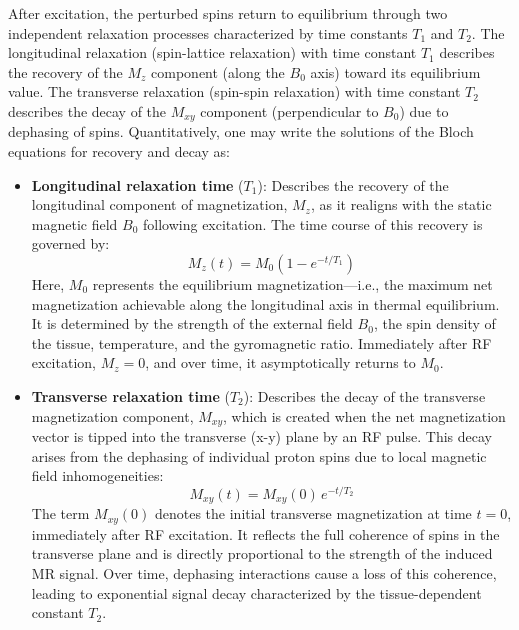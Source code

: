 After excitation, the perturbed spins return to equilibrium through two independent relaxation processes characterized by time constants $T_1$ and $T_2$. The longitudinal relaxation (spin-lattice relaxation) with time constant $T_1$ describes the recovery of the $M_z$ component (along the $B_0$ axis) toward its equilibrium value. The transverse relaxation (spin-spin relaxation) with time constant $T_2$ describes the decay of the $M_{xy}$ component (perpendicular to $B_0$) due to dephasing of spins. Quantitatively, one may write the solutions of the Bloch equations for recovery and decay as:
\begin{itemize}
    \item \textbf{Longitudinal relaxation time} (\(T_1\)): Describes the recovery of the longitudinal component of magnetization, \(M_z\), as it realigns with the static magnetic field \(B_0\) following excitation. The time course of this recovery is governed by:
    \begin{equation}
    M_z(t) = M_0 \left(1 - e^{-t/T_1}\right)
    \end{equation}
    Here, \( M_0 \) represents the equilibrium magnetization—i.e., the maximum net magnetization achievable along the longitudinal axis in thermal equilibrium. It is determined by the strength of the external field \(B_0\), the spin density of the tissue, temperature, and the gyromagnetic ratio. Immediately after RF excitation, \(M_z = 0\), and over time, it asymptotically returns to \(M_0\).

    \item \textbf{Transverse relaxation time} (\(T_2\)): Describes the decay of the transverse magnetization component, \(M_{xy}\), which is created when the net magnetization vector is tipped into the transverse (x-y) plane by an RF pulse. This decay arises from the dephasing of individual proton spins due to local magnetic field inhomogeneities:
    \begin{equation}
    M_{xy}(t) = M_{xy}(0) \, e^{-t/T_2}
    \end{equation}
    The term \( M_{xy}(0) \) denotes the initial transverse magnetization at time \( t = 0 \), immediately after RF excitation. It reflects the full coherence of spins in the transverse plane and is directly proportional to the strength of the induced MR signal. Over time, dephasing interactions cause a loss of this coherence, leading to exponential signal decay characterized by the tissue-dependent constant \(T_2\).
\end{itemize}

